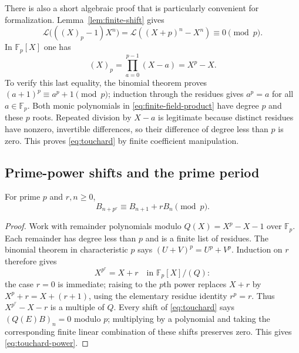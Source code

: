 There is also a short algebraic proof that is particularly convenient for
formalization. Lemma~\ref{lem:finite-shift} gives
\[
 \mathcal L\bigl(((X)_p-1)X^n\bigr)
  =\mathcal L((X+p)^n-X^n)\equiv0\pmod p.
\]
In $\mathbb F_p[X]$ one has
\begin{equation}\label{eq:finite-field-product}
 (X)_p=\prod_{a=0}^{p-1}(X-a)=X^p-X.
\end{equation}
To verify this last equality, the binomial theorem proves
$(a+1)^p\equiv a^p+1\pmod p$; induction through the residues gives
$a^p=a$ for all $a\in\mathbb F_p$. Both monic polynomials in
\eqref{eq:finite-field-product} have degree $p$ and these $p$ roots. Repeated
division by $X-a$ is legitimate because distinct residues have nonzero,
invertible differences, so their difference of degree less than $p$ is zero.
This proves \eqref{eq:touchard} by finite coefficient manipulation.

\subsection{Prime-power shifts and the prime period}

\begin{theorem}\label{thm:touchard-power}
For prime $p$ and $r,n\geq0$,
\begin{equation}\label{eq:touchard-power}
 B_{n+p^r}\equiv B_{n+1}+rB_n\pmod p.
\end{equation}
\end{theorem}
\begin{proof}
Work with remainder polynomials modulo $Q(X)=X^p-X-1$ over
$\mathbb F_p$. Each remainder has degree less than $p$ and is a finite list
of residues. The binomial theorem in characteristic $p$ says
$(U+V)^p=U^p+V^p$. Induction on $r$ therefore gives
\[
 X^{p^r}=X+r\quad\text{in }\mathbb F_p[X]/(Q):
\]
the case $r=0$ is immediate; raising to the $p$th power replaces $X+r$ by
$X^p+r=X+(r+1)$, using the elementary residue identity $r^p=r$.
Thus $X^{p^r}-X-r$ is a multiple of $Q$. Every shift of
\eqref{eq:touchard} says $(Q(E)B)_n=0$ modulo $p$; multiplying by a polynomial
and taking the corresponding finite linear combination of these shifts
preserves zero. This gives \eqref{eq:touchard-power}.
\end{proof}

